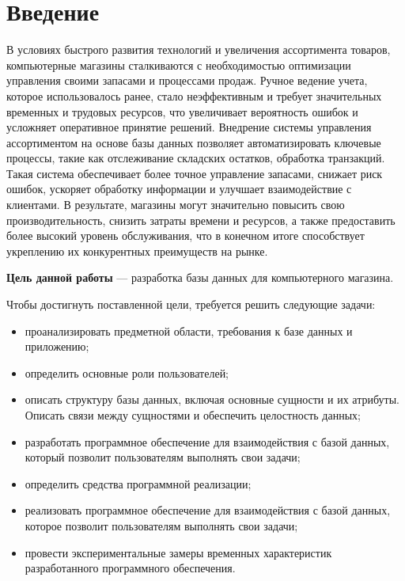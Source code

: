 \chapter*{Введение}

В условиях быстрого развития технологий и увеличения ассортимента товаров, компьютерные магазины сталкиваются с необходимостью оптимизации управления своими запасами и процессами продаж. Ручное ведение учета, которое использовалось ранее, стало неэффективным и требует значительных временных и трудовых ресурсов, что увеличивает вероятность ошибок и усложняет оперативное принятие решений. Внедрение системы управления ассортиментом на основе базы данных позволяет автоматизировать ключевые процессы, такие как отслеживание складских остатков, обработка транзакций. Такая система обеспечивает более точное управление запасами, снижает риск ошибок, ускоряет обработку информации и улучшает взаимодействие с клиентами. В результате, магазины могут значительно повысить свою производительность, снизить затраты времени и ресурсов, а также предоставить более высокий уровень обслуживания, что в конечном итоге способствует укреплению их конкурентных преимуществ на рынке. \cite{1}

\textbf{Цель данной работы} --- разработка базы данных для компьютерного магазина.

Чтобы достигнуть поставленной цели, требуется решить следующие задачи:
\begin{itemize}[label=--]
	\item проанализировать предметной области, требования к базе данных и приложению;
	\item определить основные роли пользователей;
	\item описать структуру базы данных, включая основные сущности и их атрибуты. Описать связи между сущностями и обеспечить целостность данных;
	\item разработать программное обеспечение для взаимодействия с базой данных, который позволит пользователям выполнять свои задачи;
	\item определить средства программной реализации;
	\item реализовать программное обеспечение для взаимодействия с базой данных, которое позволит пользователям выполнять свои задачи;
	\item провести экспериментальные замеры временных характеристик разработанного программного обеспечения.
\end{itemize}